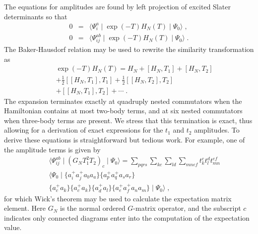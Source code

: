 The equations for amplitudes are found by left projection of 
excited Slater determinants
so that 
\begin{eqnarray}
0 &=& \langle\Psi_i^a\mid 
\exp\left(-T\right) H_N \left(T\right) \mid \Psi_0\rangle\;,  \\
0 &=& 
\langle\Psi_{ij}^{ab}\mid 
\exp\left(-T\right) H_N \left(T\right) \mid \Psi_0\rangle \;.
\end{eqnarray}
The Baker-Hausdorf 
relation may be used to rewrite the similarity
transformation as 
\begin{eqnarray}
& & \exp\left(-T\right) H_N \left(T\right)=
H_N+\left[H_N,T_1\right]+\left[H_N,T_2\right] \nonumber \\
& &+\frac{1}{2}\left[\left[H_N,T_1\right],T_1\right] 
+\frac{1}{2}\left[\left[H_N,T_2\right],T_2\right] \nonumber \\
& &+\left[\left[H_N,T_1\right],T_2\right]+\cdots \;.
\end{eqnarray}
The expansion terminates exactly at quadruply nested commutators  when
the Hamiltonian contains at most two-body terms, and at six
nested commutators when  three-body terms are present. We stress that
this termination is exact, thus allowing for a derivation of exact
expressions for the $t_1$ and $t_2$ amplitudes. To derive these equations
is straightforward but tedious work.  For example, one of the amplitude
terms is given by
\begin{eqnarray}
 & & \langle\Psi^{ab}_{ij}\mid \left(G_N T_1^2 T_2 \right)_c\mid \Psi_0\rangle
=\sum_{pqrs}\sum_{kc}\sum_{ld}\sum_{mnef} 
t^c_k t^d_l t^{ef}_{mn} \nonumber \\
& &
\langle\Psi_0\mid \{a^+_i a^+_j a_b a_a\}\{a^+_p a^+_q a_s a_r\} \nonumber \\
& & \{a^+_c a_k\}
\{a^+_c a_k\}\{a^+_d a_l\}\{a^+_e a^+_f a_n a_m\}\mid\Psi_0\rangle  \;,
\end{eqnarray}
for which Wick's theorem may be used to calculate the expectation 
matrix element.  Here $G_N$ is the normal ordered $G$-matrix operator, and the 
subscript $c$ indicates only connected diagrams enter into the computation
of the expectation value. 

